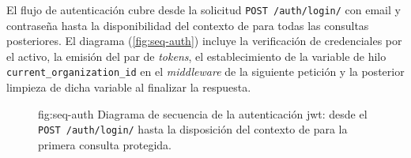 El flujo de autenticación cubre desde la solicitud
\texttt{POST /auth/login/} con email y contraseña hasta la
disponibilidad del contexto de  para todas las consultas
posteriores. El diagrama (\cref{fig:seq-auth}) incluye la
verificación de credenciales por el  activo, la emisión
del par de \textit{tokens}, el establecimiento de la variable de
hilo \texttt{current\_organization\_id} en el \textit{middleware} de
la siguiente petición y la posterior limpieza de dicha variable al
finalizar la respuesta.

\begin{figure}[Flujo de autenticación y contexto multi-tenant]%
              {fig:seq-auth}%
              {Diagrama de secuencia de la autenticación \acs{jwt}:
               desde el \texttt{POST /auth/login/} hasta la disposición
               del contexto de  para la primera consulta
               protegida.}
\end{figure}
